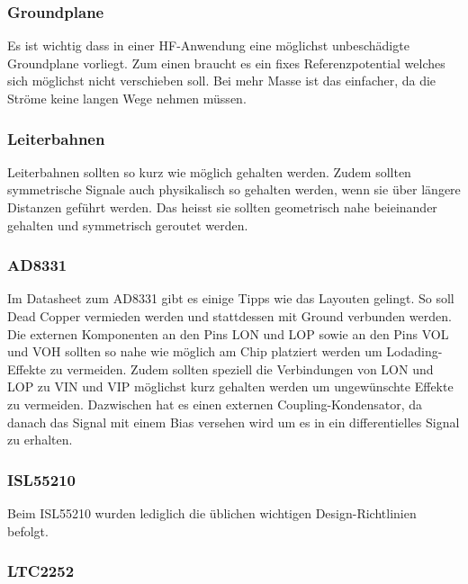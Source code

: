 \subsubsection*{Groundplane}

Es ist wichtig dass in einer HF-Anwendung eine möglichst unbeschädigte Groundplane vorliegt. Zum einen braucht es ein fixes Referenzpotential welches sich möglichst nicht verschieben soll. Bei mehr Masse ist das einfacher, da die Ströme keine langen Wege nehmen müssen.

\subsubsection*{Leiterbahnen}

Leiterbahnen sollten so kurz wie möglich gehalten werden. Zudem sollten symmetrische Signale auch physikalisch so gehalten werden, wenn sie über längere Distanzen geführt werden. Das heisst sie sollten geometrisch nahe beieinander gehalten und symmetrisch geroutet werden. 

\subsubsection*{AD8331}

Im Datasheet zum AD8331 gibt es einige Tipps wie das Layouten gelingt. So soll Dead Copper vermieden werden und stattdessen mit Ground verbunden werden.
Die externen Komponenten an den Pins LON und LOP sowie an den Pins VOL und VOH sollten so nahe wie möglich am Chip platziert werden um Lodading-Effekte zu vermeiden.
Zudem sollten speziell die Verbindungen von LON und LOP zu VIN und VIP möglichst kurz gehalten werden um ungewünschte Effekte zu vermeiden. Dazwischen hat es einen externen Coupling-Kondensator, da danach das Signal mit einem Bias versehen wird um es in ein differentielles Signal zu erhalten.

\subsubsection*{ISL55210}

Beim ISL55210 wurden lediglich die üblichen wichtigen Design-Richtlinien befolgt. 

\subsubsection*{LTC2252}

